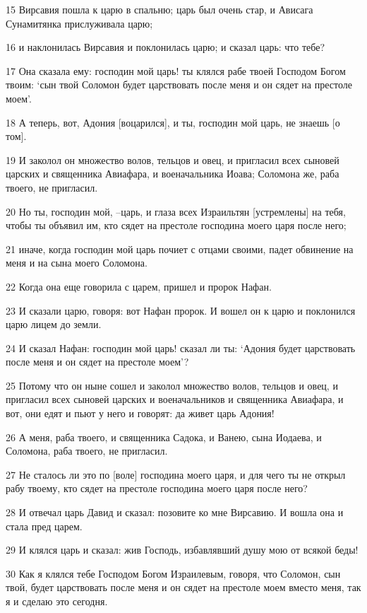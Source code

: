 \par 15 Вирсавия пошла к царю в спальню; царь был очень стар, и Ависага Сунамитянка прислуживала царю;
\par 16 и наклонилась Вирсавия и поклонилась царю; и сказал царь: что тебе?
\par 17 Она сказала ему: господин мой царь! ты клялся рабе твоей Господом Богом твоим: `сын твой Соломон будет царствовать после меня и он сядет на престоле моем'.
\par 18 А теперь, вот, Адония [воцарился], и ты, господин мой царь, не знаешь [о том].
\par 19 И заколол он множество волов, тельцов и овец, и пригласил всех сыновей царских и священника Авиафара, и военачальника Иоава; Соломона же, раба твоего, не пригласил.
\par 20 Но ты, господин мой, --царь, и глаза всех Израильтян [устремлены] на тебя, чтобы ты объявил им, кто сядет на престоле господина моего царя после него;
\par 21 иначе, когда господин мой царь почиет с отцами своими, падет обвинение на меня и на сына моего Соломона.
\par 22 Когда она еще говорила с царем, пришел и пророк Нафан.
\par 23 И сказали царю, говоря: вот Нафан пророк. И вошел он к царю и поклонился царю лицем до земли.
\par 24 И сказал Нафан: господин мой царь! сказал ли ты: `Адония будет царствовать после меня и он сядет на престоле моем'?
\par 25 Потому что он ныне сошел и заколол множество волов, тельцов и овец, и пригласил всех сыновей царских и военачальников и священника Авиафара, и вот, они едят и пьют у него и говорят: да живет царь Адония!
\par 26 А меня, раба твоего, и священника Садока, и Ванею, сына Иодаева, и Соломона, раба твоего, не пригласил.
\par 27 Не сталось ли это по [воле] господина моего царя, и для чего ты не открыл рабу твоему, кто сядет на престоле господина моего царя после него?
\par 28 И отвечал царь Давид и сказал: позовите ко мне Вирсавию. И вошла она и стала пред царем.
\par 29 И клялся царь и сказал: жив Господь, избавлявший душу мою от всякой беды!
\par 30 Как я клялся тебе Господом Богом Израилевым, говоря, что Соломон, сын твой, будет царствовать после меня и он сядет на престоле моем вместо меня, так я и сделаю это сегодня.
